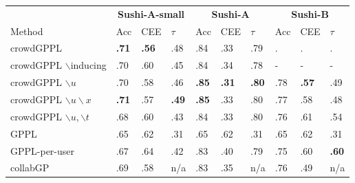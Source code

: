 \begin{table}
 \centering
 \small
 \setlength{\tabcolsep}{4pt}
 \begin{tabular}{l l l l@{\hskip 0.5cm} l l l@{\hskip 0.5cm} l l l}
\toprule
& \multicolumn{3}{c}{\textbf{Sushi-A-small}} & \multicolumn{3}{c}{\textbf{Sushi-A}} & \multicolumn{3}{c}{\textbf{Sushi-B}} \\ 
Method & Acc & CEE & $\tau$ & Acc & CEE & $\tau$ & Acc & CEE & $\tau$ \\
\midrule
crowdGPPL & \textbf{.71} & \textbf{.56} & .48 %
& .84 & .33 & .79 %
& . & . & .  %
\\
crowdGPPL $\backslash $inducing & .70 & .60 & .45 %
& .84 & .34 & .78 %
& - & - & - 
\\
crowdGPPL $\backslash u$ & .70 & .58 & .46 &  %
\textbf{.85} & \textbf{.31} & \textbf{.80} %
& .78 &\textbf{.57} & .49 %
\\
crowdGPPL $\backslash u \backslash x$ & \textbf{.71} & .57 & \textbf{.49} & %
\textbf{.85} & .33 & .80 %
& .77 & .58 & .48 %
\\
crowdGPPL $\backslash u,\backslash t$ %
& .68 & .60 & .43 %
& .84 & .33 & .80 %
& .76 & .61 & .54 %
\\ 
\midrule 
GPPL & .65 & .62 & .31 %
& .65 & .62 & .31 %
& .65 & .62 & .31 %
\\
GPPL-per-user & .67 & .64 & .42 %
& .83 & .40 & .79 %
& .75 & .60 & \textbf{.60} %
\\
collabGP & .69 & .58 & n/a %
& .83 & .35 & n/a %
& .76 & .49 & n/a %

\end{tabular}
\end{table}
